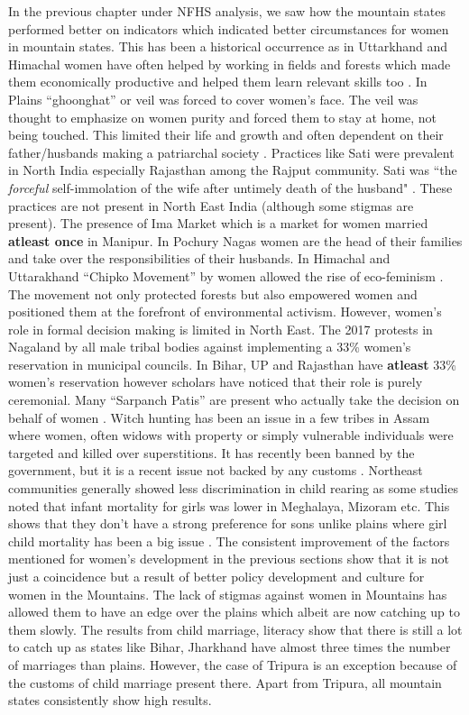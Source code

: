 In the previous chapter under NFHS analysis, we saw how the mountain states performed better on indicators which indicated better circumstances for women in mountain states. This has been a historical occurrence as in Uttarkhand and Himachal women have often helped by  working in fields and forests which made them economically productive and helped them learn relevant skills too \citep{gooch2014daughters}. In Plains ``ghoonghat'' or veil was forced to cover women's face. The veil was thought to emphasize on women purity and forced them to stay at home, not being touched. This limited their life and growth and often dependent on their father/husbands making a patriarchal society \citep{chowdhry1993persistence}. Practices like Sati were prevalent in North India especially Rajasthan among the Rajput community. Sati was ``the \textit{forceful} self-immolation of the wife after  untimely death of the husband" \citep{sangari1981sati}. These practices are not present in North East India (although some stigmas are present). The presence of Ima Market which is a market for  women married \textbf{atleast once} in Manipur. In Pochury Nagas women are the head of their families and take over the responsibilities of their husbands. In Himachal and Uttarakhand ``Chipko Movement'' by women allowed the rise of eco-feminism \citep{moore2011eco}. The movement not only protected forests but also empowered women and positioned them at the forefront of environmental activism.  However, women's role in formal decision making is limited in North East. The 2017 protests in Nagaland by all male tribal bodies against implementing a 33\% women's reservation in municipal councils.  In Bihar, UP and Rajasthan have \textbf{atleast} 33\% women's reservation however scholars have noticed that their role is purely ceremonial. Many ``Sarpanch Patis'' are present who actually take the decision on behalf of women \citep{rajasekhar2016women}. Witch hunting has been an issue in a few tribes in Assam where  women, often widows with property or simply vulnerable individuals were targeted and killed over superstitions. It has recently been banned by the government, but it is a recent issue not backed by any customs \citep{mishra2018targeting}.
Northeast communities generally showed less discrimination in child rearing as some studies noted that infant mortality for girls was lower in Meghalaya, Mizoram etc. This shows that they don't have a strong preference for sons unlike plains where girl child mortality has been a big issue \citep{mahanta2013gender}. The  consistent improvement of the factors mentioned for women's development in the previous sections show that it is not just a coincidence but a result of better policy development and culture for women in the Mountains. The lack of stigmas against women in Mountains has allowed them to have an edge over the plains which albeit are now catching up to them slowly. The results from child marriage, literacy show that there is still a lot to catch up as states like Bihar, Jharkhand have almost three times the number of marriages than plains. However, the case of Tripura is an exception because of the customs of child marriage present there. Apart from Tripura, all mountain states consistently show high results. 

